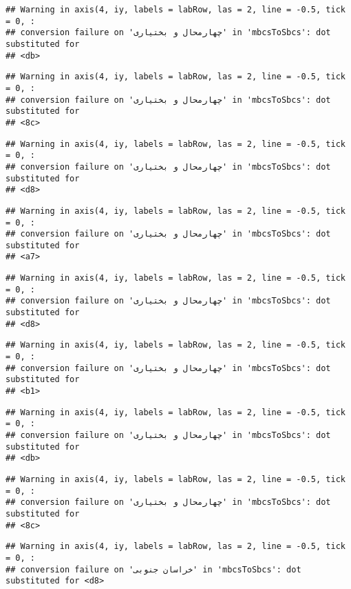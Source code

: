 \documentclass[
]{article}
\begin{document}
\begin{verbatim}
## Warning in axis(4, iy, labels = labRow, las = 2, line = -0.5, tick = 0, :
## conversion failure on 'چهارمحال و بختیاری' in 'mbcsToSbcs': dot substituted for
## <db>
\end{verbatim}

\begin{verbatim}
## Warning in axis(4, iy, labels = labRow, las = 2, line = -0.5, tick = 0, :
## conversion failure on 'چهارمحال و بختیاری' in 'mbcsToSbcs': dot substituted for
## <8c>
\end{verbatim}

\begin{verbatim}
## Warning in axis(4, iy, labels = labRow, las = 2, line = -0.5, tick = 0, :
## conversion failure on 'چهارمحال و بختیاری' in 'mbcsToSbcs': dot substituted for
## <d8>
\end{verbatim}

\begin{verbatim}
## Warning in axis(4, iy, labels = labRow, las = 2, line = -0.5, tick = 0, :
## conversion failure on 'چهارمحال و بختیاری' in 'mbcsToSbcs': dot substituted for
## <a7>
\end{verbatim}

\begin{verbatim}
## Warning in axis(4, iy, labels = labRow, las = 2, line = -0.5, tick = 0, :
## conversion failure on 'چهارمحال و بختیاری' in 'mbcsToSbcs': dot substituted for
## <d8>
\end{verbatim}

\begin{verbatim}
## Warning in axis(4, iy, labels = labRow, las = 2, line = -0.5, tick = 0, :
## conversion failure on 'چهارمحال و بختیاری' in 'mbcsToSbcs': dot substituted for
## <b1>
\end{verbatim}

\begin{verbatim}
## Warning in axis(4, iy, labels = labRow, las = 2, line = -0.5, tick = 0, :
## conversion failure on 'چهارمحال و بختیاری' in 'mbcsToSbcs': dot substituted for
## <db>
\end{verbatim}

\begin{verbatim}
## Warning in axis(4, iy, labels = labRow, las = 2, line = -0.5, tick = 0, :
## conversion failure on 'چهارمحال و بختیاری' in 'mbcsToSbcs': dot substituted for
## <8c>
\end{verbatim}

\begin{verbatim}
## Warning in axis(4, iy, labels = labRow, las = 2, line = -0.5, tick = 0, :
## conversion failure on 'خراسان جنوبی' in 'mbcsToSbcs': dot substituted for <d8>
\end{verbatim}
\end{document}

